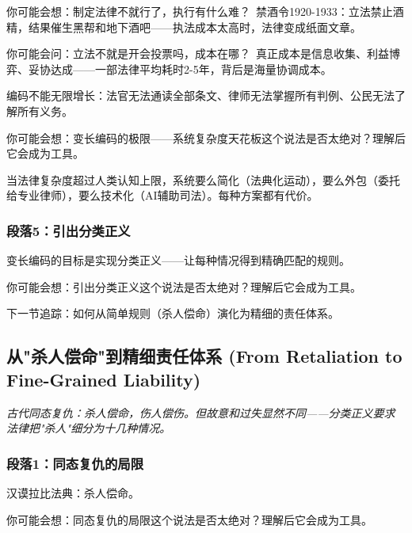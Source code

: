 \documentclass[a4paper,12pt]{book}
\newenvironment{motivation}{\begin{tcolorbox}[colback=gray!10,colframe=gray!60,title=\textit{动机}]\small\itshape}{\end{tcolorbox}}
\begin{document}
	\begin{tcolorbox}[colback=yellow!5, title=\textit{读者行为预测}]
		你可能会想：制定法律不就行了，执行有什么难？\ 禁酒令1920-1933：立法禁止酒精，结果催生黑帮和地下酒吧——执法成本太高时，法律变成纸面文章。
	\end{tcolorbox}


	\begin{tcolorbox}[colback=yellow!5, title=\textit{读者行为预测}]
		你可能会问：立法不就是开会投票吗，成本在哪？\ 真正成本是信息收集、利益博弈、妥协达成——一部法律平均耗时2-5年，背后是海量协调成本。
	\end{tcolorbox}

	编码不能无限增长：法官无法通读全部条文、律师无法掌握所有判例、公民无法了解所有义务。
	\begin{tcolorbox}[colback=yellow!5, title=\textit{读者行为预测}]
		你可能会想：变长编码的极限——系统复杂度天花板这个说法是否太绝对？理解后它会成为工具。
	\end{tcolorbox}

当法律复杂度超过人类认知上限，系统要么简化（法典化运动），要么外包（委托给专业律师），要么技术化（AI辅助司法）。每种方案都有代价。

	\subsubsection*{段落5：引出分类正义}
	变长编码的目标是实现分类正义——让每种情况得到精确匹配的规则。
	\begin{tcolorbox}[colback=yellow!5, title=\textit{读者行为预测}]
		你可能会想：引出分类正义这个说法是否太绝对？理解后它会成为工具。
	\end{tcolorbox}

下一节追踪：如何从简单规则（杀人偿命）演化为精细的责任体系。

	\subsection{从"杀人偿命"到精细责任体系 (From Retaliation to Fine-Grained Liability)}
	\begin{motivation}
		古代同态复仇：杀人偿命，伤人偿伤。但故意和过失显然不同——分类正义要求法律把"杀人"细分为十几种情况。
	\end{motivation}

	\subsubsection*{段落1：同态复仇的局限}
	汉谟拉比法典：杀人偿命。
	\begin{tcolorbox}[colback=yellow!5, title=\textit{读者行为预测}]
		你可能会想：同态复仇的局限这个说法是否太绝对？理解后它会成为工具。
	\end{tcolorbox}
\end{document}
